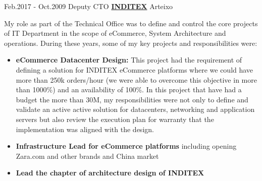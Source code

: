\documentclass[a4paper]{twentysecondcv} %
\begin{document}
\begin{twenty}
    	{Feb.2017 -}
		{Oct.2009}
        {Deputy CTO}
        {\href{https://www.inditex.com/}{\textbf{INDITEX}}}
        {Arteixo}
        {
        My role as part of the Technical Office was to define and control the core projects of IT Department in the scope of eCommerce, System Architecture and operations. During these years, some of  my key projects and responsibilities were:
        \begin{itemize}
            \item \textbf{eCommerce Datacenter Design:} This project had the requirement of defining a solution for INDITEX eCommerce platforms where we could have more than 250k orders/hour (we were able to overcome this objective in more than 1000\%) and an availability of 100\%. In this project that have had a budget the more than 30M, my responsibilities were not only to define and validate an active active solution for datacenters, networking and application servers but also review the execution plan for warranty that the implementation was aligned with the design.\\
            \item \textbf{Infrastructure Lead for eCommerce platforms} including opening Zara.com and other brands and China market\\
            \item \textbf{Lead the chapter of architecture design of INDITEX}        
        \end{itemize}
        }
        \\
\end{twenty}
\newpage
\makeprofilepagetwo %
\end{document}
